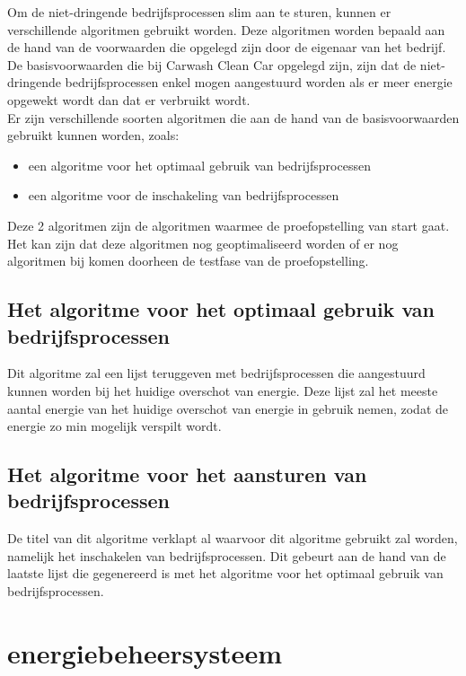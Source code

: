 Om de niet-dringende bedrijfsprocessen slim aan te sturen, kunnen er verschillende algoritmen gebruikt worden. Deze algoritmen worden bepaald aan de hand van de voorwaarden die opgelegd zijn door de eigenaar van het bedrijf. De basisvoorwaarden die bij Carwash Clean Car opgelegd zijn, zijn dat de niet-dringende bedrijfsprocessen enkel mogen aangestuurd worden als er meer energie opgewekt wordt dan dat er verbruikt wordt.\\

Er zijn verschillende soorten algoritmen die aan de hand van de basisvoorwaarden gebruikt kunnen worden, zoals:

\begin{itemize}
    \item een algoritme voor het optimaal gebruik van bedrijfsprocessen
    \item een algoritme voor de inschakeling van bedrijfsprocessen
\end{itemize}

Deze 2 algoritmen zijn de algoritmen waarmee de proefopstelling van start gaat. Het kan zijn dat deze algoritmen nog geoptimaliseerd worden of er nog algoritmen bij komen doorheen de testfase van de proefopstelling.

\subsection{Het algoritme voor het optimaal gebruik van bedrijfsprocessen}
\label{sec:stand-van-zaken-algoritme-optimaal}

Dit algoritme zal een lijst teruggeven met bedrijfsprocessen die aangestuurd kunnen worden bij het huidige overschot van energie. Deze lijst zal het meeste aantal energie van het huidige overschot van energie in gebruik nemen, zodat de energie zo min mogelijk verspilt wordt.

\subsection{Het algoritme voor het aansturen van bedrijfsprocessen}
\label{sec:stand-van-zaken-algoritme-aansturen}

De titel van dit algoritme verklapt al waarvoor dit algoritme gebruikt zal worden, namelijk het inschakelen van bedrijfsprocessen. Dit gebeurt aan de hand van de laatste lijst die gegenereerd is met het algoritme voor het optimaal gebruik van bedrijfsprocessen.

\section{energiebeheersysteem}
\label{sec:stand-van-zaken-energiebeheersysteem}

